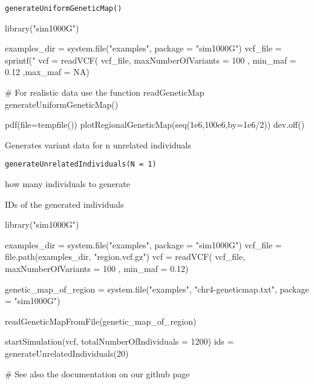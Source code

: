 \documentclass[letterpaper]{book}
\begin{document}
%
\begin{Usage}
\begin{verbatim}
generateUniformGeneticMap()
\end{verbatim}
\end{Usage}
%
\begin{Examples}
\begin{ExampleCode}

library("sim1000G")

examples_dir = system.file("examples", package = "sim1000G")
vcf_file = sprintf("%
vcf = readVCF( vcf_file, maxNumberOfVariants = 100 ,
               min_maf = 0.12 ,max_maf = NA)

# For realistic data use the function readGeneticMap
generateUniformGeneticMap()

pdf(file=tempfile())
plotRegionalGeneticMap(seq(1e6,100e6,by=1e6/2))
dev.off()

\end{ExampleCode}
\end{Examples}
%
\begin{Description}\relax
Generates variant data for n unrelated individuals
\end{Description}
%
\begin{Usage}
\begin{verbatim}
generateUnrelatedIndividuals(N = 1)
\end{verbatim}
\end{Usage}
%
\begin{Arguments}
\begin{ldescription}
\item[\code{N}] how many individuals to generate
\end{ldescription}
\end{Arguments}
%
\begin{Value}
IDs of the generated individuals
\end{Value}
%
\begin{Examples}
\begin{ExampleCode}

library("sim1000G")

examples_dir = system.file("examples", package = "sim1000G")
vcf_file = file.path(examples_dir, "region.vcf.gz")
vcf = readVCF( vcf_file, maxNumberOfVariants = 100 , min_maf = 0.12)

genetic_map_of_region =
   system.file("examples",
     "chr4-geneticmap.txt",
     package = "sim1000G")

readGeneticMapFromFile(genetic_map_of_region)

startSimulation(vcf, totalNumberOfIndividuals = 1200)
ids = generateUnrelatedIndividuals(20)

# See also the documentation on our github page

\end{ExampleCode}
\end{Examples}
\end{document}
